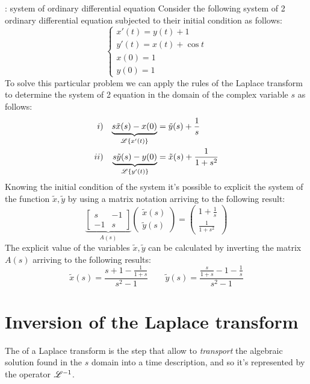 	\begin{example}{: system of ordinary differential equation}
		Consider the following system of 2 ordinary differential equation subjected to their initial condition as follows:
		\[ \begin{cases}
			x'(t) = y(t) + 1 \\ y'(t) = x(t) + \cos t \\ x(0) = 1 \\ y(0) = 1
		\end{cases} \]
		To solve this particular problem we can apply the rules of the Laplace transform to determine the system of 2 equation in the domain of the complex variable $s$ as follows:
		\begin{align*}
			i)&&  \underbrace{s \tilde x(s) - x(0)}_{\mathscr{L} \left\{ x'(t) \right\}}&=\tilde y(s) + \frac 1 s \\
			ii)&&  \underbrace{s \tilde y(s) - y(0)}_{\mathscr{L} \left\{ y'(t) \right\}}&=\tilde x(s) + \frac 1 {1+s^2}
		\end{align*}
		Knowing the initial condition of the system it's possible to explicit the system of the function $\tilde x,\tilde y$ by using a matrix notation arriving to the following result:
		\[ \underbrace{\begin{bmatrix}
			s & -1 \\ -1 & s
		\end{bmatrix}}_{A(s)} \begin{pmatrix}
			\tilde x(s) \\ \tilde y(s)
		\end{pmatrix} = \begin{pmatrix}
			1 + \frac 1 s \\ \frac  1 {1+s^2}
		\end{pmatrix} \]
		The explicit value of the variables $\tilde x,\tilde y$ can be calculated by inverting the matrix $A(s)$ arriving to the following results:
		\[ \tilde x (s) = \frac{s+1 - \frac 1 {1+s}}{s^2-1} \qquad \tilde y(s) = \frac{\frac s {1+s} - 1  - \frac 1 s }{s^2-1} \]
		
	\end{example}

\section{Inversion of the Laplace transform}
	
	The  of a Laplace transform is the step that allow to \textit{transport} the algebraic solution found in the $s$ domain into a time description, and so it's represented by the operator $\mathscr{L}^{-1}$.
	
